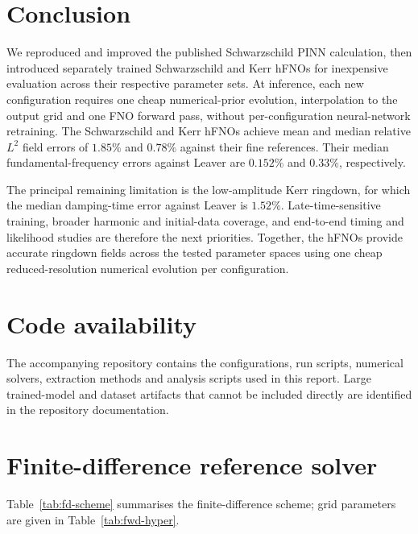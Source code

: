 \documentclass[11pt,a4paper]{article}
\theoremstyle{definition}
\begin{document}
\section{Conclusion}\label{sec:conclusion}

We reproduced and improved the published Schwarzschild PINN
calculation, then introduced separately trained Schwarzschild and Kerr
hFNOs for inexpensive evaluation across their respective parameter
sets. At inference, each new configuration requires one cheap
numerical-prior evolution, interpolation to the output grid and one
FNO forward pass, without per-configuration neural-network
retraining. The Schwarzschild and Kerr hFNOs achieve mean and median
relative $L^2$ field errors of $1.85\%$ and $0.78\%$ against their
fine references. Their median fundamental-frequency errors against
Leaver are $0.152\%$ and $0.33\%$, respectively.

The principal remaining limitation is the low-amplitude Kerr
ringdown, for which the median damping-time error against Leaver is
$1.52\%$. Late-time-sensitive training, broader harmonic and
initial-data coverage, and end-to-end timing and likelihood studies
are therefore the next priorities. Together, the hFNOs provide
accurate ringdown fields across the tested parameter spaces using one
cheap reduced-resolution numerical evolution per configuration.

\section*{Code availability}

The accompanying repository contains the configurations, run
scripts, numerical solvers, extraction methods and analysis
scripts used in this report. Large trained-model and dataset
artifacts that cannot be included directly are identified in the
repository documentation.

\appendix
\section{Finite-difference reference solver}\label{app:fd}

Table~\ref{tab:fd-scheme} summarises the finite-difference scheme;
grid parameters are given in Table~\ref{tab:fwd-hyper}.
\end{document}

